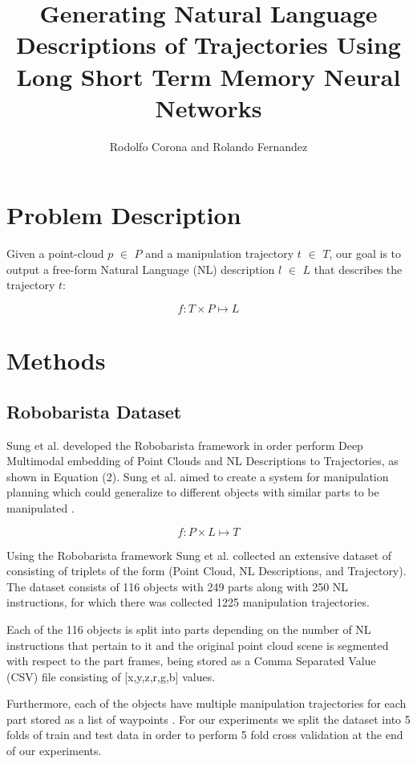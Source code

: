 \documentclass[letterpaper, 12 pt, conference]{ieeeconf}
\title{\LARGE \bf
Generating Natural Language Descriptions of Trajectories Using Long Short Term Memory Neural Networks}
\author{Rodolfo Corona and Rolando Fernandez}
\begin{document}
\maketitle
\thispagestyle{empty}
\pagestyle{empty}

\section{Problem Description}

Given a point-cloud $p$ $\in$ $P$ and a manipulation trajectory $t$ $\in$ $T$, our goal is to output a free-form  Natural Language (NL) description $l$ $\in$ $L$ that describes the trajectory $t$:

\begin{equation}
f: T\times P \mapsto L
\end{equation}

\section{Methods}

\subsection{Robobarista Dataset}

Sung et al. developed the Robobarista framework in order perform Deep Multimodal embedding of Point Clouds and NL Descriptions to Trajectories, as shown in Equation (2). Sung et al. aimed to create a system for manipulation planning which could generalize to different objects with similar parts to be manipulated \cite{sung2016robobarista}. 

\begin{equation}
f: P\times L \mapsto T
\end{equation}

Using the Robobarista framework Sung et al. collected an extensive dataset of consisting of triplets of the form (Point Cloud, NL Descriptions, and Trajectory). The dataset consists of 116 objects with 249 parts along with 250 NL instructions, for which there was collected 1225 manipulation trajectories. 

Each of the 116 objects is split into parts depending on the number of NL instructions that pertain to it and the original point cloud scene is segmented with respect to the part frames, being stored as a Comma Separated Value (CSV) file consisting of [x,y,z,r,g,b] values. 

Furthermore, each of the objects have multiple manipulation trajectories for each part stored as a list of waypoints \cite{sung2016robobarista}. For our experiments we split the dataset into 5 folds of train and test data in order to perform 5 fold cross validation at the end of our experiments.
\end{document}
